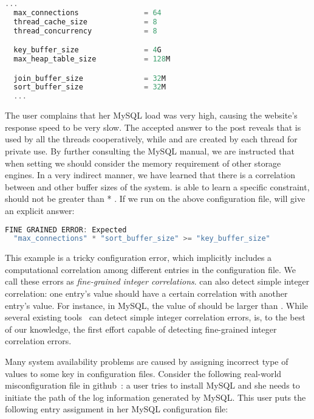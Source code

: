 \begin{lstlisting}[language=C, xleftmargin=.01\textwidth]
  ...
  max_connections               = 64
  thread_cache_size             = 8
  thread_concurrency            = 8

  key_buffer_size               = 4G
  max_heap_table_size           = 128M

  join_buffer_size              = 32M
  sort_buffer_size              = 32M    
  ...
\end{lstlisting} 

The user complains that her MySQL load was very high, 
causing the website's response speed to be very slow.
The accepted answer to the post reveals that  
is used by all the threads cooperatively, 
while  and  are created 
by each thread for private use.
By further consulting the MySQL manual, 
we are instructed that when setting  we should consider the memory requirement of other storage engines.
In a very indirect manner, we have learned that there is a correlation
between  and other buffer sizes of the system.
\app is able to learn a specific constraint, \ie
{} should not be greater than
 * .
If we run \app on the above configuration file, \app will give an explicit answer:

\begin{lstlisting}[language=C, xleftmargin=.01\textwidth]
FINE GRAINED ERROR: Expected 
  "max_connections" * "sort_buffer_size" >= "key_buffer_size"
\end{lstlisting} 

This example is a tricky configuration error, which implicitly
includes a computational correlation among different entries
in the configuration file.
We call these errors as {\em fine-grained integer correlations}. 
\app can also detect simple integer correlation: one entry's
value should have a certain correlation with another entry's 
value.
For instance, in MySQL, the value of  
should be larger than .
While several existing tools~\cite{yin11anempirical, zhang14encore}
can detect simple integer correlation errors,
\app is, to the best of our knowledge, the first effort capable of
detecting fine-grained integer correlation errors.

Many system availability problems are caused by 
assigning incorrect type of values to some key in configuration
files. Consider the following real-world misconfiguration
file in github~\cite{typeerror}:
a user tries to install MySQL and she needs to initiate the path
of the log information generated by MySQL.
This user puts the following entry assignment in her MySQL
configuration file: 

